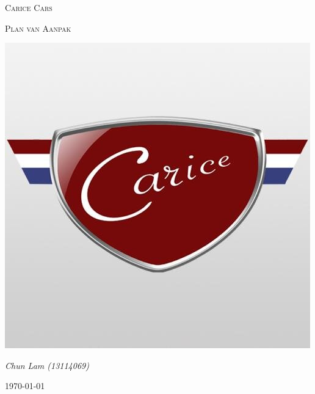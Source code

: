 \documentclass[]{report}
\begin{document}
\begin{titlepage}
\centering
\par\vspace{1cm}
{\scshape\LARGE Carice Cars \par}
\vspace{1cm}
{\scshape\Large Plan van Aanpak  \par}
\vspace{0.5cm}

\includegraphics[scale=0.5]{figures/logo.jpeg}

\vfill
{\Large\itshape Chun Lam (13114069)\par}


\vspace{1cm}
{\large \today\par}
\end{titlepage}
\newpage

%


\end{document}
